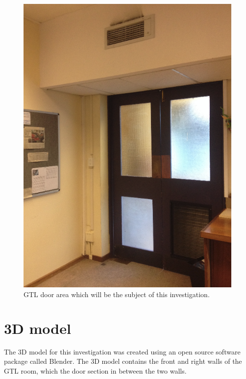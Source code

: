 \documentclass[11pt,a4paper]{report}
\begin{document}
		\begin{figure}[H]
			\centering
			\includegraphics[width=1\textwidth]{gtl_door_area}
			\caption[GTL test image]{GTL door area which will be the subject of this investigation.}
		\end{figure}
		
	\section{3D model}
		The 3D model for this investigation was created using an open source software package called Blender. The 3D model contains the front and right walls of the GTL room, which the door section in between the two walls.
		
\end{document}
